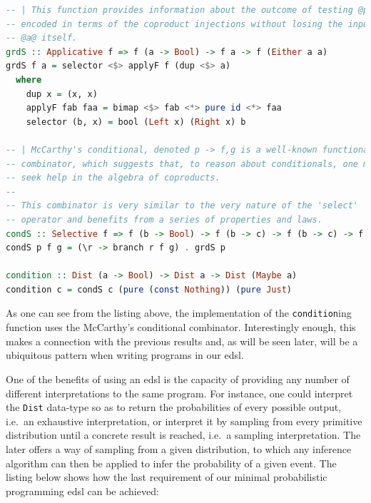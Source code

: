 \documentclass[
  oneside,
  11pt, a4paper,
  footinclude=true,
  headinclude=true,
  cleardoublepage=empty
]{scrbook}
\theoremstyle{definition}
\theoremstyle{definition}
\begin{document}
    \begin{lstlisting}[language=Haskell, caption={Conditioning function},captionpos=b]
-- | This function provides information about the outcome of testing @p@ on some input @a@,
-- encoded in terms of the coproduct injections without losing the input
-- @a@ itself.
grdS :: Applicative f => f (a -> Bool) -> f a -> f (Either a a)
grdS f a = selector <$> applyF f (dup <$> a)
  where
    dup x = (x, x)
    applyF fab faa = bimap <$> fab <*> pure id <*> faa
    selector (b, x) = bool (Left x) (Right x) b

-- | McCarthy's conditional, denoted p -> f,g is a well-known functional
-- combinator, which suggests that, to reason about conditionals, one may
-- seek help in the algebra of coproducts.
--
-- This combinator is very similar to the very nature of the 'select'
-- operator and benefits from a series of properties and laws.
condS :: Selective f => f (b -> Bool) -> f (b -> c) -> f (b -> c) -> f b -> f c
condS p f g = (\r -> branch r f g) . grdS p

condition :: Dist (a -> Bool) -> Dist a -> Dist (Maybe a)
condition c = condS c (pure (const Nothing)) (pure Just)
    \end{lstlisting}
    
    As one can see from the listing above, the implementation of the \texttt{condition}ing function uses the McCarthy's conditional combinator. Interestingly enough, this makes a connection with the previous results and, as will be seen later, will be a ubiquitous pattern when writing programs in our \gls{edsl}.
    
    One of the benefits of using an \gls{edsl} is the capacity of providing any number of different interpretations to the same program. For instance, one could interpret the \texttt{Dist} data-type so as to return the probabilities of every possible output, i.e.\ an exhaustive interpretation, or interpret it by sampling from every primitive distribution until a concrete result is reached, i.e.\ a sampling interpretation. The later offers a way of sampling from a given distribution, to which any inference algorithm can then be applied to infer the probability of a given event. The listing below shows how the last requirement of our minimal probabilistic programming \gls{edsl} can be achieved:
    
\end{document}
